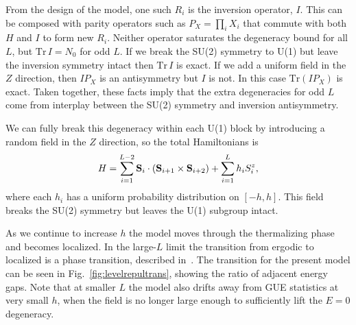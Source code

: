 \documentclass[aps,prx,reprint,superscriptaddress, longbibliography]{revtex4-1}
\newcommand{\Tr}{ \mbox{Tr}}
\begin{document}
From the design of the model, one such $R_i$ is the inversion operator, $I$. This can be composed with parity operators such as $P_X=\prod_i X_i$ that commute with both $H$ and $I$ to form new $R_i$. Neither operator saturates the degeneracy bound for all $L$, but $\Tr\,I=N_0$ for odd $L$. If we break the SU(2) symmetry to U(1) but leave the inversion symmetry intact then $\Tr\,I$ is exact. If we add a uniform field in the $Z$ direction, then $IP_X$ is an antisymmetry but $I$ is not. In this case $\Tr(IP_X)$ is exact. Taken together, these facts imply that the extra degeneracies for odd $L$ come from interplay between the SU(2) symmetry and inversion antisymmetry.


We can fully break this degeneracy within each U(1) block by introducing a random field in the $Z$ direction, so the total Hamiltonians is
\begin{align}
H = \sum_{i=1}^{L-2}{\bf S}_i\cdot({\bf S}_{i+1}\times {\bf S}_{i+2}) + 
	\sum_{i=1}^{L}h_iS_i^z,
\end{align}
where each $h_i$ has a uniform probability distribution on $[-h,h]$. This field breaks the SU(2) symmetry but leaves the U(1) subgroup intact.

As we continue to increase $h$ the model moves through the thermalizing phase and becomes localized. In the large-$L$ limit the transition from ergodic to localized is a phase transition, described in~\cite{1010.1992v1}. The transition for the present model can be seen in Fig.~\ref{fig:levelrepultrans}, showing the ratio of adjacent energy gaps. Note that at smaller $L$ the model also drifts away from GUE statistics at very small $h$, when the field is no longer large enough to sufficiently lift the $E=0$ degeneracy.
\end{document}
